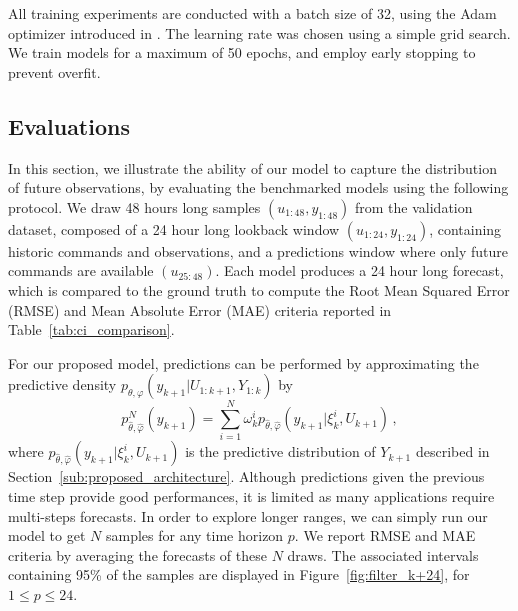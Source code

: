 \documentclass[journal]{IEEEtran}
\begin{document}
All training experiments are conducted with a batch size of 32, using the Adam optimizer introduced in \cite{Kingma2015AdamAM}.
The learning rate was chosen using a simple grid search.
We train models for a maximum of 50 epochs, and employ early stopping to prevent overfit.

\subsection{Evaluations}%
\label{sub:evaluations}

In this section, we illustrate the ability of our model to capture the distribution of future observations, by evaluating the benchmarked models using the following protocol. We draw 48 hours long samples $(u_{1:48}, y_{1:48})$ from the validation dataset, composed of a 24 hour long lookback window $(u_{1:24}, y_{1:24})$, containing historic commands and observations, and a predictions window where only future commands are available $(u_{25:48})$.
Each model produces a 24 hour long forecast, which is compared to the ground truth to compute the Root Mean Squared Error (RMSE) and Mean Absolute Error (MAE) criteria reported in Table~\ref{tab:ci_comparison}. %

For our proposed model, predictions can be performed by approximating the predictive density $p_{\theta,\varphi}(y_{k+1}|U_{1:k+1},Y_{1:k})$ by
$$
	p^N_{\widehat\theta,\widehat\varphi}(y_{k+1})= \sum_{i=1}^{N}\omega_k^i p_{\widehat\theta,\widehat\varphi}(y_{k+1}|\xi_k^i,U_{k+1})\,,
$$
where $ p_{\widehat\theta,\widehat\varphi}(y_{k+1}|\xi_k^i,U_{k+1})$ is the predictive distribution of $Y_{k+1}$ described in Section~\ref{sub:proposed_architecture}.
Although predictions given the previous time step provide good performances, it is limited as many applications require multi-steps forecasts.
In order to explore longer ranges, we can simply run our model to get $N$ samples for any time horizon $p$.
We report RMSE and MAE criteria by averaging the forecasts of these $N$ draws.
The associated intervals containing 95\% of the samples are displayed in Figure~\ref{fig:filter_k+24}, for $1\leq p \leq 24$.
\end{document}
